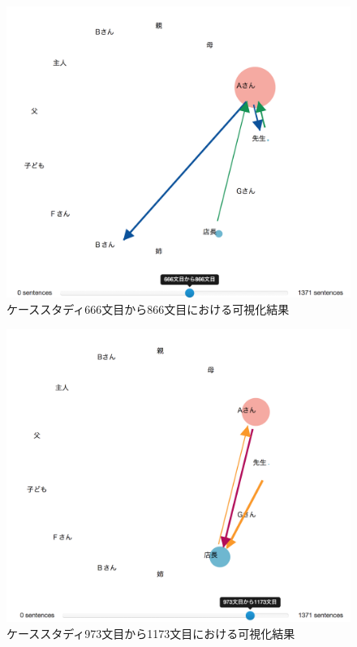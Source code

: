 \documentclass[shuuron]{kuee}
\begin{document}
\begin{figure}
  \begin{center}
    \includegraphics[width=\linewidth]{caseSecond.png}
  \end{center}
  \caption{ケーススタディ666文目から866文目における可視化結果}
  \label{fig:caseSecond}
\end{figure}

\begin{figure}
  \begin{center}
    \includegraphics[width=\linewidth]{caseThird.png}
  \end{center}
  \caption{ケーススタディ973文目から1173文目における可視化結果}
  \label{fig:caseThird}
\end{figure}
\end{document}
